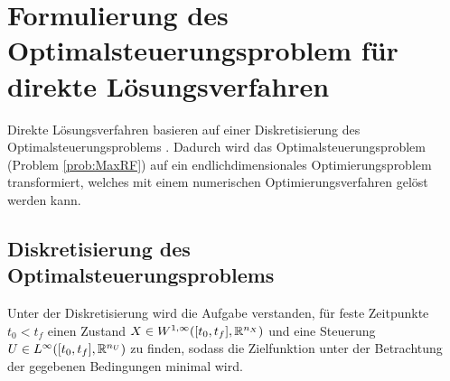 \chapter{Formulierung des Optimalsteuerungsproblem für direkte Lösungsverfahren} \label{cha:direct}

Direkte Lösungsverfahren basieren auf einer Diskretisierung des Optimalsteuerungsproblems \cite{Stryk1992}. Dadurch wird das Optimalsteuerungsproblem (Problem \ref{prob:MaxRF}) auf ein endlichdimensionales Optimierungsproblem transformiert, welches mit einem numerischen Optimierungsverfahren gelöst werden kann.

\section{Diskretisierung des Optimalsteuerungsproblems}
Unter der Diskretisierung wird die Aufgabe verstanden, für feste Zeitpunkte $t_0 < t_f$ einen Zustand $X \in W^{1, \infty} ([t_0,t_f], \mathbb{R}^{n_X})$ und eine Steuerung $U \in L^{\infty} ([t_0,t_f], \mathbb{R}^{n_U})$ zu finden, sodass die Zielfunktion unter der Betrachtung der gegebenen Bedingungen minimal wird.

